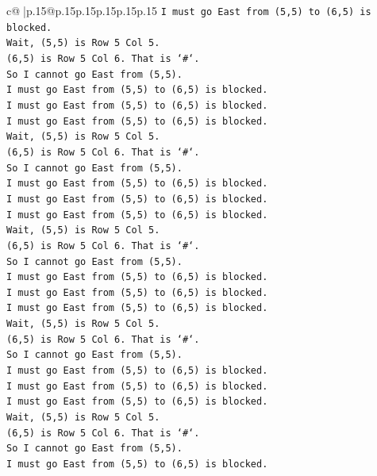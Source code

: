 \documentclass{article}
\begin{document}
{\begin{supertabular}{c@{$\;$}|p{.15\linewidth}@{}p{.15\linewidth}p{.15\linewidth}p{.15\linewidth}p{.15\linewidth}p{.15\linewidth}}
{{{\texttt{I must go East from (5,5) to (6,5) is blocked.} \\
\texttt{Wait, (5,5) is Row 5 Col 5.} \\
\texttt{(6,5) is Row 5 Col 6. That is `\#`.} \\
\texttt{So I cannot go East from (5,5).} \\
\texttt{I must go East from (5,5) to (6,5) is blocked.} \\
\texttt{I must go East from (5,5) to (6,5) is blocked.} \\
\texttt{I must go East from (5,5) to (6,5) is blocked.} \\
\texttt{Wait, (5,5) is Row 5 Col 5.} \\
\texttt{(6,5) is Row 5 Col 6. That is `\#`.} \\
\texttt{So I cannot go East from (5,5).} \\
\texttt{I must go East from (5,5) to (6,5) is blocked.} \\
\texttt{I must go East from (5,5) to (6,5) is blocked.} \\
\texttt{I must go East from (5,5) to (6,5) is blocked.} \\
\texttt{Wait, (5,5) is Row 5 Col 5.} \\
\texttt{(6,5) is Row 5 Col 6. That is `\#`.} \\
\texttt{So I cannot go East from (5,5).} \\
\texttt{I must go East from (5,5) to (6,5) is blocked.} \\
\texttt{I must go East from (5,5) to (6,5) is blocked.} \\
\texttt{I must go East from (5,5) to (6,5) is blocked.} \\
\texttt{Wait, (5,5) is Row 5 Col 5.} \\
\texttt{(6,5) is Row 5 Col 6. That is `\#`.} \\
\texttt{So I cannot go East from (5,5).} \\
\texttt{I must go East from (5,5) to (6,5) is blocked.} \\
\texttt{I must go East from (5,5) to (6,5) is blocked.} \\
\texttt{I must go East from (5,5) to (6,5) is blocked.} \\
\texttt{Wait, (5,5) is Row 5 Col 5.} \\
\texttt{(6,5) is Row 5 Col 6. That is `\#`.} \\
\texttt{So I cannot go East from (5,5).} \\
\texttt{I must go East from (5,5) to (6,5) is blocked.} \\
}}}
\end{supertabular}}
\end{document}
